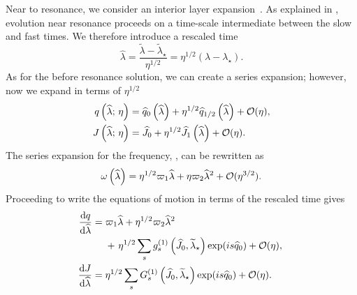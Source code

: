 Near to resonance, we consider an interior layer expansion~\cite{Kevorkian1971}. As explained in , evolution near resonance proceeds on a time-scale intermediate between the slow and fast times. We therefore introduce a rescaled time
\begin{equation}
\widehat{\lambda} = \dfrac{\widetilde{\lambda} - \widetilde{\lambda}_\star}{\eta^{1/2}} = \eta^{1/2}(\lambda - \lambda_\star).
\end{equation}
As for the before resonance solution, we can create a series expansion; however, now we expand in terms of $\eta^{1/2}$~\cite{Flanagan2012}
\begin{subequations}
\begin{align}
q\left(\widehat{\lambda};\,\eta\right) = {} & \widehat{q}_0\left(\widehat{\lambda}\right) + \eta^{1/2} \widehat{q}_{1/2}\left(\widehat{\lambda}\right) + \mathcal{O}({\eta}), \\
J\left(\widehat{\lambda};\,\eta\right) = {} & \widehat{J}_0 + \eta^{1/2} \widehat{J}_1\left(\widehat{\lambda}\right) + \mathcal{O}({\eta}).
\end{align}
\end{subequations}
The series expansion for the frequency, , can be rewritten as
\begin{equation}
\omega\left(\widehat{\lambda}\right) = \eta^{1/2}\varpi_1\widehat{\lambda} + \eta\varpi_2\widehat{\lambda}^2 + \mathcal{O}({\eta^{3/2}}).
\label{eq:omega-hat}
\end{equation}
Proceeding to write the equations of motion in terms of the rescaled time gives
\begin{subequations}
\begin{align}
\dfrac{\mathrm{d} {q}}{\mathrm{d} {\widehat{\lambda}}} = {} & \varpi_1\widehat{\lambda} + \eta^{1/2}\varpi_2\widehat{\lambda}^2 \nonumber \\ 
 {} & + \left. \eta^{1/2}\sum_s g_s^{(1)}\left(\widehat{J}_0,\widetilde{\lambda}_\star\right)\exp(is \widehat{q}_0)  + \mathcal{O}({\eta}), \right. \\
\dfrac{\mathrm{d} {J}}{\mathrm{d} {\widehat{\lambda}}} = {} & \eta^{1/2}\sum_s G_s^{(1)}\left(\widehat{J}_0,\widetilde{\lambda}_\star\right)\exp(is \widehat{q}_0) + \mathcal{O}({\eta}).
\end{align}
\end{subequations}

